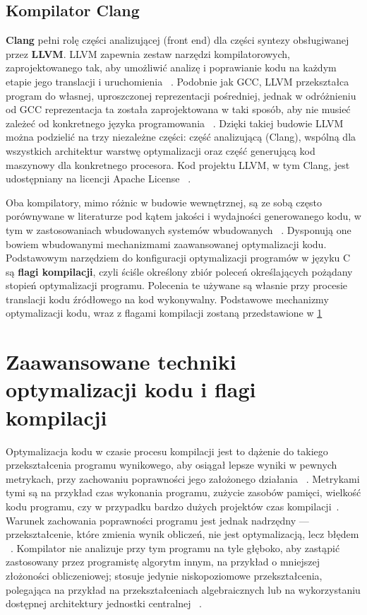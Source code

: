 \subsection{Kompilator Clang}

\textbf{Clang} pełni rolę części analizującej (front end) dla części syntezy obsługiwanej przez \textbf{LLVM}. LLVM zapewnia zestaw narzędzi kompilatorowych, zaprojektowanego tak, aby umożliwić analizę i poprawianie kodu na każdym etapie jego translacji i uruchomienia ~\cite{lattner2004llvm}. Podobnie jak GCC, LLVM przekształca program do własnej, uproszczonej reprezentacji pośredniej, jednak w odróżnieniu od GCC reprezentacja ta została zaprojektowana w taki sposób, aby nie musieć zależeć od konkretnego języka programowania ~\cite{lattner2004llvm}. Dzięki takiej budowie LLVM można podzielić na trzy niezależne części: część analizującą (Clang), wspólną dla wszystkich architektur warstwę optymalizacji oraz część generującą kod maszynowy dla konkretnego procesora. Kod projektu LLVM, w tym Clang, jest udostępniany na licencji Apache License ~\cite{LLVMDevPolicy}.

Oba kompilatory, mimo różnic w budowie wewnętrznej, są ze sobą często porównywane w literaturze pod kątem jakości i wydajności generowanego kodu, w tym w zastosowaniach wbudowanych systemów wbudowanych ~\cite{poorhosseini2020compiler}. Dysponują one  bowiem wbudowanymi mechanizmami zaawansowanej optymalizacji kodu.
Podstawowym narzędziem do konfiguracji optymalizacji programów w języku C są \textbf{flagi kompilacji}, czyli ściśle określony zbiór poleceń określających pożądany stopień optymalizacji programu. Polecenia te używane są własnie przy procesie translacji kodu źródłowego na kod wykonywalny. Podstawowe mechanizmy optymalizacji kodu, wraz z flagami kompilacji zostaną przedstawione w \cref{section:TechnikiOptymalizacji}
\section{Zaawansowane techniki optymalizacji kodu i flagi kompilacji}\label{section:TechnikiOptymalizacji}
Optymalizacja kodu w czasie procesu kompilacji jest to dążenie do takiego przekształcenia programu wynikowego, aby osiągał lepsze wyniki w pewnych metrykach, przy zachowaniu poprawności jego założonego działania ~\cite{Kompilatory_Aho}. Metrykami tymi są na przykład czas wykonania programu, zużycie zasobów pamięci, wielkość kodu programu, czy w przypadku bardzo dużych projektów czas kompilacji~\cite{Kompilatory_Aho}. Warunek zachowania poprawności programu jest jednak nadrzędny — przekształcenie, które zmienia wynik obliczeń, nie jest optymalizacją, lecz błędem ~\cite{Kompilatory_Aho}.  Kompilator nie analizuje przy tym programu na tyle głęboko, aby zastąpić zastosowany przez programistę algorytm innym, na przykład o mniejszej złożoności obliczeniowej; stosuje jedynie niskopoziomowe przekształcenia, polegająca na przykład na przekształceniach algebraicznych lub na wykorzystaniu dostępnej architektury jednostki centralnej ~\cite{Kompilatory_Aho}.

